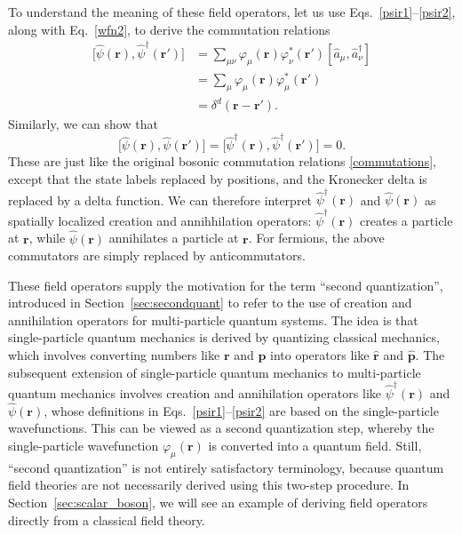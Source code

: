 \documentclass[prx,12pt]{revtex4-2}
\begin{document}
To understand the meaning of these field operators, let us use
Eqs.~\eqref{psir1}--\eqref{psir2}, along with Eq.~\eqref{wfn2}, to
derive the commutation relations
\begin{align}
  \big[\hat{\psi}(\mathbf{r}), \hat{\psi}^\dagger(\mathbf{r}')\big]
  &= \sum_{\mu\nu} \varphi_\mu(\mathbf{r}) \varphi_\nu^*(\mathbf{r}')
  \left[\hat{a}_\mu, \hat{a}_\nu^\dagger\right] \\
  &= \sum_{\mu} \varphi_\mu(\mathbf{r}) \varphi_\mu^*(\mathbf{r}') \\
  &= \delta^d(\mathbf{r}-\mathbf{r}').
\end{align}
Similarly, we can show that
\begin{equation}
  \big[\hat{\psi}(\mathbf{r}), \hat{\psi}(\mathbf{r}')\big]
  = \big[\hat{\psi}^\dagger(\mathbf{r}), \hat{\psi}^\dagger(\mathbf{r}')\big]
  = 0.
\end{equation}
These are just like the original bosonic commutation relations
\eqref{commutations}, except that the state labels replaced by
positions, and the Kronecker delta is replaced by a delta function.
We can therefore interpret $\hat{\psi}^\dagger(\mathbf{r})$ and
$\hat{\psi}(\mathbf{r})$ as spatially localized creation and
annihhilation operators: $\hat{\psi}^\dagger(\mathbf{r})$ creates a
particle at $\mathbf{r}$, while $\hat{\psi}(\mathbf{r})$ annihilates a
particle at $\mathbf{r}$.  For fermions, the above commutators are
simply replaced by anticommutators.

\label{second_quantization_terminology}
These field operators supply the motivation for the term ``second
quantization'', introduced in Section~\ref{sec:secondquant} to refer
to the use of creation and annihilation operators for multi-particle
quantum systems.  The idea is that single-particle quantum mechanics
is derived by quantizing classical mechanics, which involves
converting numbers like $\mathbf{r}$ and $\mathbf{p}$ into operators
like $\hat{\mathbf{r}}$ and $\hat{\mathbf{p}}$.  The subsequent
extension of single-particle quantum mechanics to multi-particle
quantum mechanics involves creation and annihilation operators like
$\hat{\psi}^\dagger(\mathbf{r})$ and $\hat{\psi}(\mathbf{r})$, whose
definitions in Eqs.~\eqref{psir1}--\eqref{psir2} are based on the
single-particle wavefunctions.  This can be viewed as a second
quantization step, whereby the single-particle wavefunction
$\varphi_\mu(\mathbf{r})$ is converted into a quantum field.  Still,
``second quantization'' is not entirely satisfactory terminology,
because quantum field theories are not necessarily derived using this
two-step procedure.  In Section~\ref{sec:scalar_boson}, we will see an
example of deriving field operators directly from a classical field
theory.
\end{document}
